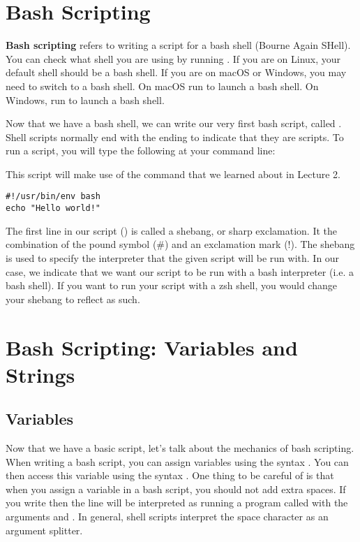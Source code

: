 \documentclass{article}
\begin{document}
\section{Bash Scripting}
\textbf{Bash scripting} refers to writing a script for a bash shell (Bourne Again SHell). You can check what shell you are using by running .
If you are on Linux, your default shell should be a bash shell. If you are on macOS or Windows, you may need to switch to a bash shell. On macOS run  to launch a bash shell. On Windows, run  to launch a bash shell. 
\par 
Now that we have a bash shell, we can write our very first bash script, called . Shell scripts normally end with the  ending to indicate that they are scripts. To run a script, you will type the following at your command line:
\par 
This script will make use of the  command that we learned about in Lecture 2.
\begin{lstlisting}[style=Python]
#!/usr/bin/env bash
echo "Hello world!"
\end{lstlisting}
The first line in our script () is called a shebang, or sharp exclamation. It the combination of the pound symbol (\#) and an exclamation mark (!). The shebang is used to specify the interpreter that the given script will be run with. In our case, we indicate that we want our script to be run with a bash interpreter (i.e. a bash shell). If you want to run your script with a zsh shell, you would change your shebang to reflect as such.
\par
\section{Bash Scripting: Variables and Strings}
\subsection{Variables}
Now that we have a basic script, let's talk about the mechanics of bash scripting. When writing a bash script, you can assign variables using the syntax . You can then access this variable using the syntax . One thing to be careful of is that when you assign a variable in a bash script, you should not add extra spaces. If you write  then the line will be interpreted as running a program called  with the arguments \inlinecode{=} and . In general, shell scripts interpret the space character as an argument splitter.
\par 
\end{document}
